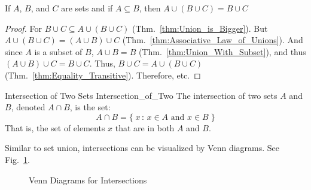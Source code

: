             \begin{theorem}
                \label{thm:Redundant_Union}%
                If $A$, $B$, and $C$ are sets and if
                $A\subseteq{B}$, then
                $A\cup(B\cup{C})=B\cup{C}$
            \end{theorem}
            \begin{proof}
                For $B\cup{C}\subseteq{A}\cup(B\cup{C})$
                (Thm.~\ref{thm:Union_is_Bigger}). But
                $A\cup(B\cup{C})=(A\cup{B})\cup{C}$
                (Thm.~\ref{thm:Associative_Law_of_Unions}).
                And since $A$ is a subset of $B$,
                $A\cup{B}=B$ (Thm.~\ref{thm:Union_With_Subset}),
                and thus $(A\cup{B})\cup{C}=B\cup{C}$. Thus,
                $B\cup{C}=A\cup(B\cup{C})$
                (Thm.~\ref{thm:Equality_Transitive}).
                Therefore, etc.
            \end{proof}
            \begin{ldefinition}{Intersection of Two Sets}
                  {Intersection_of_Two}
                The intersection of two sets $A$ and $B$,
                denoted $A\cap{B}$, is the set:
                \begin{equation}
                    A\cap{B}
                    =\{\;x\,:\,x\in{A}\textrm{ and }x\in{B}\;\}
                \end{equation}
                That is, the set of elements $x$ that are in
                both $A$ and $B$.
            \end{ldefinition}
            Similar to set union, intersections can be visualized
            by Venn diagrams. See
            Fig.~\ref{fig:Union_Intersection_venn_diagram}.
            \begin{figure}[H]
                \centering
                \captionsetup{type=figure}
                \begin{subfigure}[b]{0.49\textwidth}
                    \centering
                    
                \end{subfigure}
                \begin{subfigure}[b]{0.49\textwidth}
                    \centering
                    
                \end{subfigure}
                \caption{Venn Diagrams for Intersections}
                \label{fig:Union_Intersection_venn_diagram}
            \end{figure}
